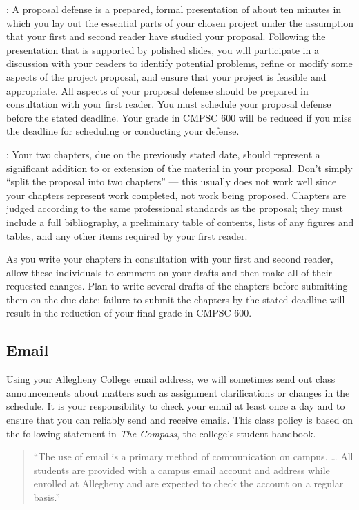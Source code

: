 : A proposal defense is a prepared, formal presentation of about ten minutes in which you
lay out the essential parts of your chosen project under the assumption that your first and second reader have studied
your proposal.  Following the presentation that is supported by polished slides, you will participate in a discussion
with your readers to identify potential problems, refine or modify some aspects of the project proposal, and ensure that
your project is feasible and appropriate. All aspects of your proposal defense should be prepared in consultation with
your first reader.  You must schedule your proposal defense before the stated deadline. Your grade in CMPSC 600 will be
reduced if you miss the deadline for scheduling or conducting your defense.

: Your two chapters, due on the previously stated date, should represent a significant
addition to or extension of the material in your proposal. Don't simply ``split the proposal into two chapters'' ---
this usually does not work well since your chapters represent work completed, not work being proposed.  Chapters are
judged according to the same professional standards as the proposal; they must include a full bibliography, a
preliminary table of contents, lists of any figures and tables, and any other items required by your first reader.

As you write your chapters in consultation with your first and second reader, allow these individuals to comment on your
drafts and then make all of their requested changes.  Plan to write several drafts of the chapters before submitting them
on the due date; failure to submit the chapters by the stated deadline will result in the reduction of your final grade
in CMPSC 600.

\vspace*{-.2in}
\subsection*{Email}

Using your Allegheny College email address, we will sometimes send out class announcements about matters such as
assignment clarifications or changes in the schedule. It is your responsibility to check your email at least once a day
and to ensure that you can reliably send and receive emails. This class policy is based on the following statement in
{\em The Compass}, the college's student handbook.

\vspace*{-.1in}
\begin{quote}
``The use of email is a primary method of communication on campus. \ldots
All students are provided with a campus email account and address while
enrolled at Allegheny and are expected to check the account on a regular
basis.''
\end{quote}
\vspace*{-.3in}

